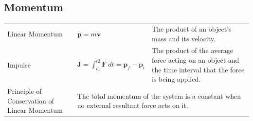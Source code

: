 \documentclass[a4paper,11pt]{article}
\begin{document}
		\subsection{Momentum}
			\begin{center}
				\renewcommand{\arraystretch}{1.2}
				\begin{tabular}{@{} p{2.7cm} l p{6.8cm} @{}}
					\toprule
					Linear Momentum & $\textbf{p}=m\textbf{v}$ & The product of an object's mass and its velocity. \\
					\rule{0pt}{20pt}Impulse & $\displaystyle \textbf{J}=\int_{t1}^{t2}\textbf{F}~dt=\textbf{p}_{f}-\textbf{p}_{i}$	& The product of the average force acting on an object and the time interval that the force is being applied.\\	
					\midrule
					Principle of Conservation of Linear Momentum & \multicolumn{2}{p{10.7cm}}{The total momentum of the system is a constant when no external resultant force acts on it.}\\
					\bottomrule
				\end{tabular}
			\end{center}
\end{document}
